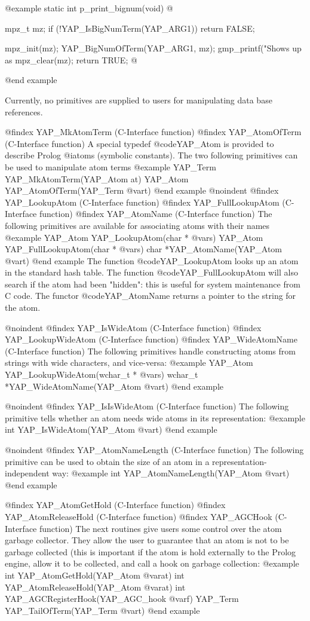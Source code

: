 {{{{{{{{{@example
static int
p_print_bignum(void)
@{
  mpz_t mz;
  if (!YAP_IsBigNumTerm(YAP_ARG1))
    return FALSE;

  mpz_init(mz);
  YAP_BigNumOfTerm(YAP_ARG1, mz);
  gmp_printf("Shows up as %
  mpz_clear(mz);
  return TRUE;
@}
@end example


Currently, no primitives are supplied to users for manipulating data base
references. 

@findex YAP_MkAtomTerm (C-Interface function)
@findex YAP_AtomOfTerm (C-Interface function)
A special typedef @code{YAP_Atom} is provided to describe Prolog
@i{atoms} (symbolic constants). The two following primitives can be used
to manipulate atom terms
@example
      YAP_Term YAP_MkAtomTerm(YAP_Atom at)
      YAP_Atom YAP_AtomOfTerm(YAP_Term @var{t})
@end example
@noindent
@findex YAP_LookupAtom (C-Interface function)
@findex YAP_FullLookupAtom (C-Interface function)
@findex YAP_AtomName (C-Interface function)
The following primitives are available for associating atoms with their
names 
@example
      YAP_Atom  YAP_LookupAtom(char * @var{s})
      YAP_Atom  YAP_FullLookupAtom(char * @var{s})
      char     *YAP_AtomName(YAP_Atom @var{t})
@end example
The function @code{YAP_LookupAtom} looks up an atom in the standard hash
table. The function @code{YAP_FullLookupAtom} will also search if the
atom had been "hidden": this is useful for system maintenance from C
code. The functor @code{YAP_AtomName} returns a pointer to the string
for the atom.

@noindent
@findex YAP_IsWideAtom (C-Interface function)
@findex YAP_LookupWideAtom (C-Interface function)
@findex YAP_WideAtomName (C-Interface function)
The following primitives handle constructing atoms from strings with
wide characters, and vice-versa:
@example
      YAP_Atom  YAP_LookupWideAtom(wchar_t * @var{s})
      wchar_t  *YAP_WideAtomName(YAP_Atom @var{t})
@end example

@noindent
@findex YAP_IsIsWideAtom (C-Interface function)
The following primitive tells whether an atom needs wide atoms in its
representation:
@example
      int  YAP_IsWideAtom(YAP_Atom @var{t})
@end example

@noindent
@findex YAP_AtomNameLength (C-Interface function)
The following primitive can be used to obtain the size of an atom in a
representation-independent way: 
@example
      int      YAP_AtomNameLength(YAP_Atom @var{t})
@end example

@findex YAP_AtomGetHold  (C-Interface function)
@findex YAP_AtomReleaseHold  (C-Interface function)
@findex YAP_AGCHook  (C-Interface function)
The next routines give users some control over  the atom
garbage collector. They allow the user to guarantee that an atom is not
to be garbage collected (this is important if the atom is hold
externally to the Prolog engine, allow it to be collected, and call a
hook on garbage collection:
@example
      int  YAP_AtomGetHold(YAP_Atom @var{at})
      int  YAP_AtomReleaseHold(YAP_Atom @var{at})
      int  YAP_AGCRegisterHook(YAP_AGC_hook @var{f})
      YAP_Term  YAP_TailOfTerm(YAP_Term @var{t})
@end example

}}}}}}}}}
